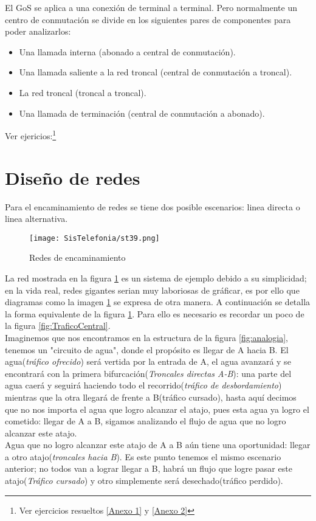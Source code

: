 \documentclass[
	12pt, %
	fleqn, %
	a4paper, %
]{LegrandOrangeBook}
\begin{document}
El GoS se aplica a una conexión de terminal a terminal. Pero normalmente un centro de conmutación se divide en los siguientes pares de componentes para poder analizarlos:
\begin{itemize}
\item Una llamada interna (abonado a central de conmutación).
\item Una llamada saliente a la red troncal (central de conmutación a troncal).
\item La red troncal (troncal a troncal).
\item Una llamada de terminación (central de conmutación a abonado).
\end{itemize}
Ver ejericios:\footnote{Ver ejercicios resueltos \ref{Anexo 1} y \ref{Anexo 2}}
\section{Diseño de redes}
Para el encaminamiento de redes se tiene dos posible escenarios: linea directa o linea alternativa.
\begin{figure}[ht]
\centering\texttt{[image: SisTelefonia/st39.png]}
\caption{Redes de encaminamiento}
\label{fig:Rutas}
\end{figure}
La red mostrada en la figura \ref{fig:Rutas} es un sistema de ejemplo debido a su simplicidad; en la vida real, redes gigantes serian muy laboriosas de gráficar, es por ello que diagramas como la imagen \ref{fig:Rutas} se expresa de otra manera. A continuación se detalla la forma equivalente de la figura \ref{fig:Rutas}. Para ello es necesario es recordar un poco de la figura \ref{fig:TraficoCentral}.\\
Imaginemos que nos encontramos en la estructura de la figura \ref{fig:analogia}, tenemos un "circuito de agua", donde el propósito es llegar de A hacia B. El agua(\textit{tráfico ofrecido}) será vertida por la entrada de A, el agua avanzará y se encontrará con la primera bifurcación(\textit{Troncales directas A-B}): una parte del agua caerá y seguirá haciendo todo el recorrido(\textit{tráfico de desbordamiento}) mientras que la otra llegará de frente a B(tráfico cursado), hasta aquí decimos que no nos importa el agua que logro alcanzar el atajo, pues esta agua ya logro el cometido: llegar de A a B, sigamos analizando el flujo de agua que no logro alcanzar este atajo.\\
Agua que no logro alcanzar este atajo de A a B aún tiene una oportunidad: llegar a otro atajo(\textit{troncales hacia B}). Es este punto tenemos el mismo escenario anterior; no todos van a lograr llegar a B, habrá un flujo que logre pasar este atajo(\textit{Tráfico cursado}) y otro simplemente será desechado(tráfico perdido).\\
\end{document}
